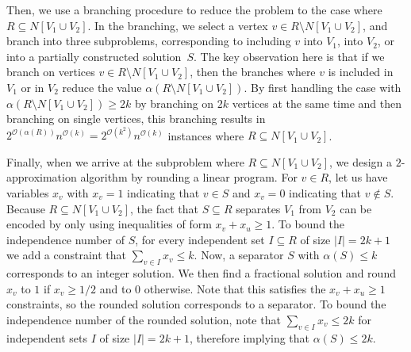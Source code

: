 \documentclass[11pt]{article}
\theoremstyle{definition}
\newcommand{\OO}{\mathcal{O}}
\begin{document}
Then, we use a branching procedure to reduce the problem to the case where $R \subseteq N[V_1 \cup V_2]$. In the branching, we select a vertex $v \in R \setminus N[V_1 \cup V_2]$, and branch into three subproblems, corresponding to including $v$ into $V_1$, into $V_2$, or into a partially constructed solution~$S$.
The key observation here is that if we branch on vertices $v \in R \setminus N[V_1 \cup V_2]$, then the branches where $v$ is included in $V_1$ or in $V_2$ reduce the value $\alpha(R \setminus N[V_1 \cup V_2])$.
By first handling the case with $\alpha(R \setminus N[V_1 \cup V_2]) \ge 2k$ by branching on $2k$ vertices at the same time and then branching on single vertices, this branching results in $2^{\OO(\alpha(R))} n^{\OO(k)} = 2^{\OO(k^2)} n^{\OO(k)}$ instances where $R \subseteq N[V_1 \cup V_2]$.


Finally, when we arrive at the subproblem where $R \subseteq N[V_1 \cup V_2]$, we design a \hbox{$2$-approximation} algorithm by rounding a linear program.
For $v\in R$, let us have variables $x_v$ with $x_v = 1$ indicating that $v \in S$ and $x_v = 0$ indicating that $v \notin S$.
Because $R \subseteq N[V_1 \cup V_2]$, the fact that $S \subseteq R$ separates $V_1$ from $V_2$ can be encoded by only using inequalities of form $x_v + x_u \ge 1$.
To bound the independence number of $S$, for every independent set $I\subseteq R$ of size $|I| = 2k+1$ we add a constraint that $\sum_{v \in I} x_v \le k$.
Now, a separator $S$ with $\alpha(S) \le k$ corresponds to an integer solution.
We then find a fractional solution and round $x_v$ to $1$ if $x_v \ge 1/2$ and to $0$ otherwise.
Note that this satisfies the $x_v + x_u \ge 1$ constraints, so the rounded solution corresponds to a separator.
To bound the independence number of the rounded solution, note that $\sum_{v \in I} x_v \le 2k$  for independent sets $I$ of size $|I| = 2k+1$, therefore implying that $\alpha(S) \le 2k$.
\end{document}
